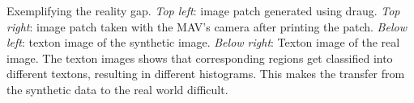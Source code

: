 \label{fig:realitygap}
Exemplifying the reality
    gap. \emph{Top left}: image patch generated using draug. \emph{Top
      right}: image patch taken with the MAV's camera after printing
    the patch. \emph{Below left}: texton image of the synthetic
    image. \emph{Below right}: Texton image of the real image. The
    texton images shows that corresponding regions get classified into
    different textons, resulting in different histograms. This makes
    the transfer from the synthetic data to the real world difficult.